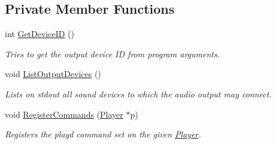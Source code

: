 \subsection*{Private Member Functions}
\begin{DoxyCompactItemize}
\item 
int \hyperlink{classplayd_a767d029a5d1321e912c1a2a92e8f3c64}{Get\+Device\+I\+D} ()
\begin{DoxyCompactList}\small\item\em Tries to get the output device I\+D from program arguments. \end{DoxyCompactList}\item 
void \hyperlink{classplayd_a9b32921db2f987d1faa28cbac50a0ed3}{List\+Output\+Devices} ()
\begin{DoxyCompactList}\small\item\em Lists on stdout all sound devices to which the audio output may connect. \end{DoxyCompactList}\item 
void \hyperlink{classplayd_a9fa7e8f2ccbd46c10bd604bb510d6304}{Register\+Commands} (\hyperlink{classPlayer}{Player} $\ast$p)
\begin{DoxyCompactList}\small\item\em Registers the playd command set on the given \hyperlink{classPlayer}{Player}. \end{DoxyCompactList}\end{DoxyCompactItemize}
